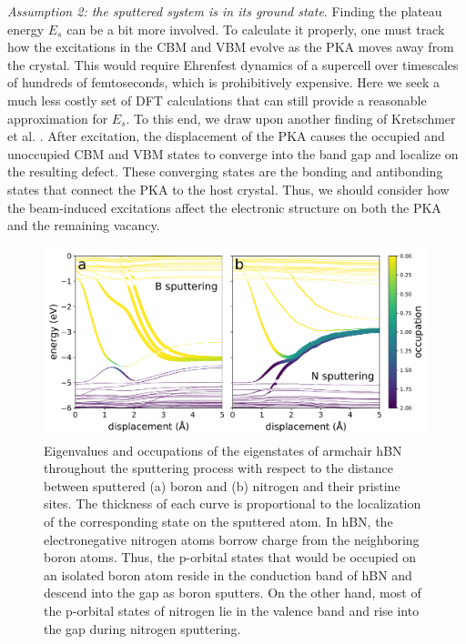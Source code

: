 \documentclass{article}
\begin{document}
\medskip\noindent
\textit{Assumption 2: the sputtered system is in its ground state}.
Finding the plateau energy $E_s$ can be a bit more involved. To calculate it
properly, one must track how the excitations in the CBM and VBM evolve as the
PKA moves away from the crystal. This would require Ehrenfest dynamics of a
supercell over timescales of hundreds of femtoseconds, which is prohibitively
expensive.
Here we seek a much less costly set of DFT calculations that can still provide
a reasonable approximation for $E_s$.
To this end, we draw upon another finding of Kretschmer et al.
\cite{Kretschmer2020}.
After excitation, the displacement of the PKA causes the occupied and
unoccupied CBM and VBM states to converge into the band gap and localize on the
resulting defect.
These converging states are the bonding and antibonding states that connect the
PKA to the host crystal.
Thus, we should consider how the beam-induced excitations affect the electronic
structure on both the PKA and the remaining vacancy.

\begin{figure}
  \centering
  \includegraphics[width=\textwidth]{fig4.pdf}
  \caption{
    Eigenvalues and occupations of the eigenstates of armchair hBN throughout
    the sputtering process with respect to the distance between sputtered (a)
    boron and (b) nitrogen and their pristine sites.
    The thickness of each curve is proportional to the localization of the
    corresponding state on the sputtered atom.
    In hBN, the electronegative nitrogen atoms borrow charge from the
    neighboring boron atoms.
    Thus, the p-orbital states that would be occupied on an isolated boron atom
    reside in the conduction band of hBN and descend into the gap as boron
    sputters.
    On the other hand, most of the p-orbital states of nitrogen lie in the
    valence band and rise into the gap during nitrogen sputtering.
  }
  \label{fig:eigenvals}
\end{figure}
\end{document}

